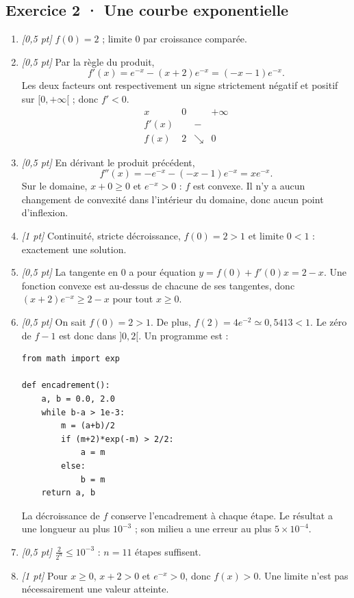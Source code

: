 \subsection*{Exercice 2 · Une courbe exponentielle}\begin{enumerate}

\item \textit{[0,5 pt]} $f(0)=2$ ; limite $0$ par croissance comparée.

\item \textit{[0,5 pt]} Par la règle du produit,
\[f'(x)=e^{-x}-(x+2)e^{-x}=(-x-1)e^{-x}.\]
Les deux facteurs ont respectivement un signe strictement négatif et positif sur $[0,+\infty[$ ; donc $f'<0$.
\[\begin{array}{c|ccc}x&0&&+\infty\\\hline f'(x)&&-&\\\hline f(x)&2&\searrow&0\end{array}\]

\item \textit{[0,5 pt]} En dérivant le produit précédent,
\[f''(x)=-e^{-x}-(-x-1)e^{-x}=xe^{-x}.\]
Sur le domaine, $x+0\ge0$ et $e^{-x}>0$ : $f$ est convexe. Il n'y a aucun changement de convexité dans l'intérieur du domaine, donc aucun point d'inflexion.

\item \textit{[1 pt]} Continuité, stricte décroissance, $f(0)=2>1$ et limite $0<1$ : exactement une solution.

\item \textit{[0,5 pt]} La tangente en $0$ a pour équation $y=f(0)+f'(0)x=2-x$. Une fonction convexe est au-dessus de chacune de ses tangentes, donc $(x+2)e^{-x}\ge 2-x$ pour tout $x\ge0$.


\item \textit{[0,5 pt]} On sait $f(0)=2>1$. De plus, $f(2)=4e^{-2}\simeq0{,}5413<1$. Le zéro de $f-1$ est donc dans $]0,2[$. Un programme est :
\begin{lstlisting}
from math import exp

def encadrement():
    a, b = 0.0, 2.0
    while b-a > 1e-3:
        m = (a+b)/2
        if (m+2)*exp(-m) > 2/2:
            a = m
        else:
            b = m
    return a, b
\end{lstlisting}
La décroissance de $f$ conserve l'encadrement à chaque étape. Le résultat a une longueur au plus $10^{-3}$ ; son milieu a une erreur au plus $5\times10^{-4}$.

\item \textit{[0,5 pt]} $\frac{2}{2^n}\le10^{-3}$ : $n=11$ étapes suffisent.

\item \textit{[1 pt]} Pour $x\ge0$, $x+2>0$ et $e^{-x}>0$, donc $f(x)>0$. Une limite n'est pas nécessairement une valeur atteinte.

\end{enumerate}

